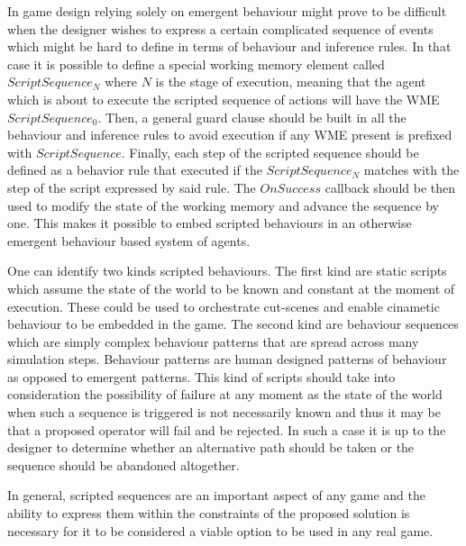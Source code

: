 In game design relying solely on emergent behaviour might prove to be difficult when the designer wishes to express a certain complicated sequence of events which might be hard to define in terms of behaviour and inference rules.
In that case it is possible to define a special working memory element called $ScriptSequence_N$ where $N$ is the stage of execution, meaning that the agent which is about to execute the scripted sequence of actions will have the WME $ScriptSequence_0$.
Then, a general guard clause should be built in all the behaviour and inference rules to avoid execution if any WME present is prefixed with $ScriptSequence$.
Finally, each step of the scripted sequence should be defined as a behavior rule that executed if the $ScriptSequence_N$ matches with the step of the script expressed by said rule.
The $OnSuccess$ callback should be then used to modify the state of the working memory and advance the sequence by one.
This makes it possible to embed scripted behaviours in an otherwise emergent behaviour based system of agents.

One can identify two kinds scripted behaviours.
The first kind are static scripts which assume the state of the world to be known and constant at the moment of execution.
These could be used to orchestrate cut-scenes and enable cinametic behaviour to be embedded in the game.
The second kind are behaviour sequences which are simply complex behaviour patterns that are spread across many simulation steps.
Behaviour patterns are human designed patterns of behaviour as opposed to emergent patterns.
This kind of scripts should take into consideration the possibility of failure at any moment as the state of the world when such a sequence is triggered is not necessarily known and thus it may be that a proposed operator will fail and be rejected.
In such a case it is up to the designer to determine whether an alternative path should be taken or the sequence should be abandoned altogether.

In general, scripted sequences are an important aspect of any game and the ability to express them within the constraints of the proposed solution is necessary for it to be considered a viable option to be used in any real game.